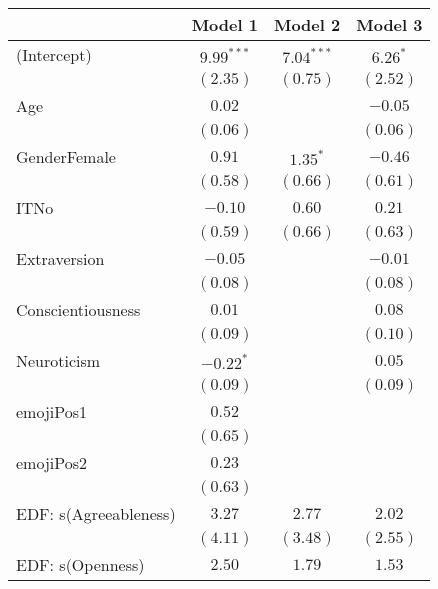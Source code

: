 \begin{table}
\begin{center}
\begin{tabular}{l c c c }
\hline
 & Model 1 & Model 2 & Model 3 \\
\hline
(Intercept)               & $9.99^{***}$ & $7.04^{***}$ & $6.26^{*}$ \\
                          & $(2.35)$     & $(0.75)$     & $(2.52)$   \\
Age                       & $0.02$       &              & $-0.05$    \\
                          & $(0.06)$     &              & $(0.06)$   \\
GenderFemale              & $0.91$       & $1.35^{*}$   & $-0.46$    \\
                          & $(0.58)$     & $(0.66)$     & $(0.61)$   \\
ITNo                      & $-0.10$      & $0.60$       & $0.21$     \\
                          & $(0.59)$     & $(0.66)$     & $(0.63)$   \\
Extraversion              & $-0.05$      &              & $-0.01$    \\
                          & $(0.08)$     &              & $(0.08)$   \\
Conscientiousness         & $0.01$       &              & $0.08$     \\
                          & $(0.09)$     &              & $(0.10)$   \\
Neuroticism               & $-0.22^{*}$  &              & $0.05$     \\
                          & $(0.09)$     &              & $(0.09)$   \\
emojiPos1                 & $0.52$       &              &            \\
                          & $(0.65)$     &              &            \\
emojiPos2                 & $0.23$       &              &            \\
                          & $(0.63)$     &              &            \\
EDF: s(Agreeableness)     & $3.27$       & $2.77$       & $2.02$     \\
                          & $(4.11)$     & $(3.48)$     & $(2.55)$   \\
EDF: s(Openness)          & $2.50$       & $1.79$       & $1.53$     \\

\end{tabular}
\end{center}
\end{table}
